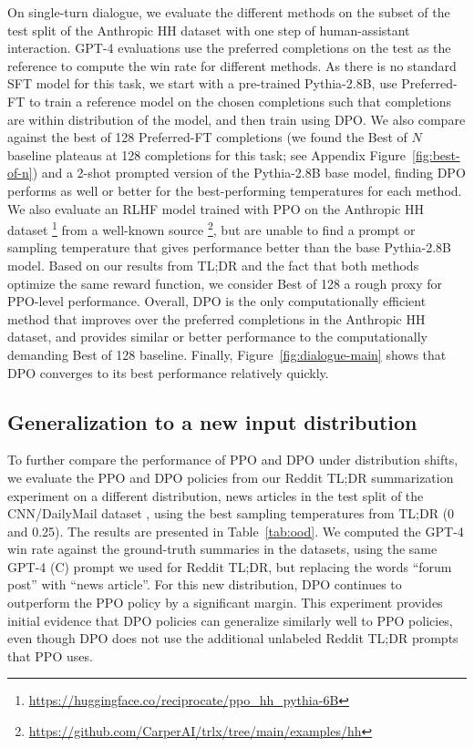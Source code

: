 On single-turn dialogue, we evaluate the different methods on the subset of the test split of the Anthropic HH dataset \citep{bai2022training} with one step of human-assistant interaction. GPT-4 evaluations use the preferred completions on the test as the reference to compute the win rate for different methods. As there is no standard SFT model for this task, we start with a pre-trained Pythia-2.8B, use Preferred-FT to train a reference model on the chosen completions such that completions are within distribution of the model, and then train using DPO. We also compare against the best of 128 Preferred-FT completions (we found the Best of $N$ baseline plateaus at 128 completions for this task; see Appendix Figure~\ref{fig:best-of-n}) and a 2-shot prompted version of the Pythia-2.8B base model, finding DPO performs as well or better for the best-performing temperatures for each method. We also evaluate an RLHF model trained with PPO on the Anthropic HH dataset \footnote{\url{https://huggingface.co/reciprocate/ppo_hh_pythia-6B}} from a well-known source \footnote{\url{https://github.com/CarperAI/trlx/tree/main/examples/hh}}, but are unable to find a prompt or sampling temperature that gives performance better than the base Pythia-2.8B model. Based on our results from TL;DR and the fact that both methods optimize the same reward function, we consider Best of 128 a rough proxy for PPO-level performance. Overall, DPO is the only computationally efficient method that improves over the preferred completions in the Anthropic HH dataset, and provides similar or better performance to the computationally demanding Best of 128 baseline. Finally, Figure~\ref{fig:dialogue-main} shows that DPO converges to its best performance relatively quickly.

\subsection{Generalization to a new input distribution}



To further compare the performance of PPO and DPO under distribution shifts, we evaluate the PPO and DPO policies from our Reddit TL;DR summarization experiment on a different distribution, news articles in the test split of the CNN/DailyMail dataset \citep{nallapati-etal-2016-abstractive}, using the best sampling temperatures from TL;DR (0 and 0.25). The results are presented in Table~\ref{tab:ood}. We computed the GPT-4 win rate against the ground-truth summaries in the datasets, using the same GPT-4 (C) prompt we used for Reddit TL;DR, but replacing the words ``forum post'' with ``news article''. For this new distribution, DPO continues to outperform the PPO policy by a significant margin. This experiment provides initial evidence that DPO policies can generalize similarly well to PPO policies, even though DPO does not use the additional unlabeled Reddit TL;DR prompts that PPO uses.

